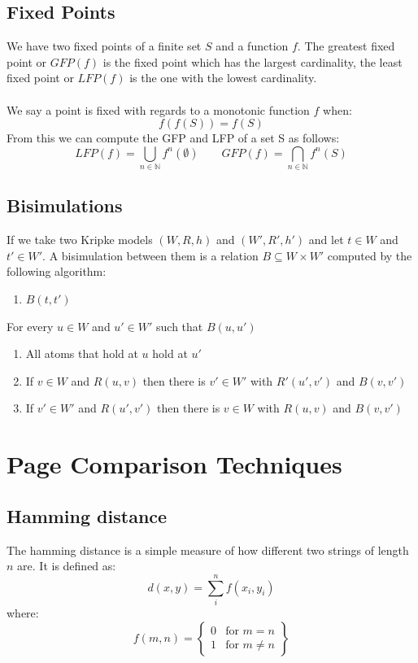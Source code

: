 \documentclass[12pt,twoside]{report}
\begin{document}
\subsection{Fixed Points}
We have two fixed points of a finite set $S$ and a function $f$. The greatest fixed point or $GFP(f)$ is the fixed point which has the largest cardinality, the least fixed point or $LFP(f)$ is the one with the lowest cardinality.
\\\\
We say a point is fixed with regards to a monotonic function $f$ when:
$$f(f(S)) = f(S)$$
From this we can compute the GFP and LFP of a set S as follows:
$$LFP(f) = \bigcup_{n \in \mathbb{N}}f^n(\emptyset) \qquad GFP(f) = \bigcap_{n \in \mathbb{N}}f^n(S)$$
\subsection{Bisimulations}
If we take two Kripke models $(W, R, h)$ and $(W', R', h')$ and let $t\in W$ and $t'\in W'$. A bisimulation between them is a relation $B \subseteq W \times W'$ computed by the following algorithm:
\begin{enumerate}
\item $B(t, t')$
\end{enumerate}
For every $u \in W$ and $u' \in W'$ such that $B(u, u')$
\begin{enumerate}[resume]
\item All atoms that hold at $u$ hold at $u'$
\item If $v \in W$ and $R(u, v)$ then there is $v' \in W'$ with $R'(u', v')$ and $B(v, v')$
\item If $v' \in W'$ and $R(u', v')$ then there is $v \in W$ with $R(u, v)$ and $B(v, v')$
\end{enumerate}
\section{Page Comparison Techniques}
\subsection{Hamming distance}
The hamming distance is a simple measure of how different two strings of length $n$ are. It is defined as:
$$d(x, y) = \sum_i^nf(x_i, y_i)$$
where:
  \[
    f(m,n) = \left\{\begin{array}{lr}
        0 & \text{for } m = n\\
        1 & \text{for } m \neq n
        \end{array}\right\}
  \]
\end{document}

